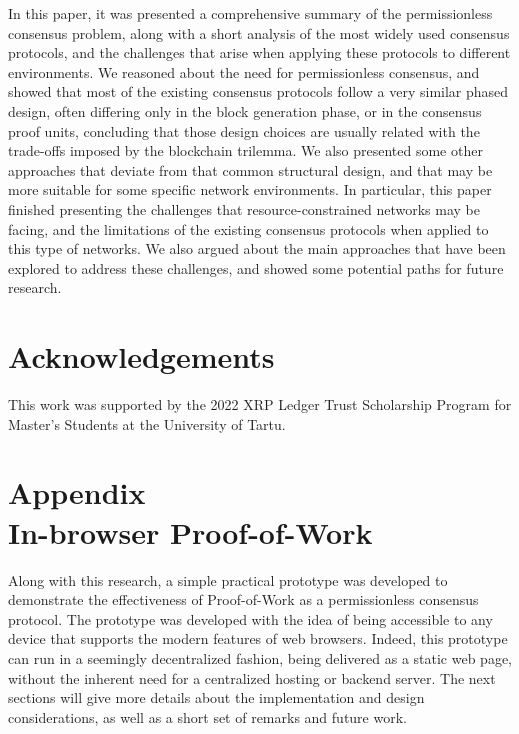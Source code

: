 \documentclass[journal]{IEEEtran}
\begin{document}
In this paper, it was presented a comprehensive summary of the permissionless
consensus problem, along with a short analysis of the most widely used consensus 
protocols, and the challenges that arise when applying these protocols to different environments.
We reasoned about the need for permissionless consensus, and showed that most of the existing
consensus protocols follow a very similar phased design, often differing only in the block
generation phase, or in the consensus proof units, concluding that those design choices are usually 
related with the trade-offs imposed by the blockchain trilemma.
We also presented some other approaches that deviate from that common
structural design, and that may be more suitable for some specific network environments.
In particular, this paper finished presenting the challenges that resource-constrained networks may be facing, 
and the limitations of the existing consensus protocols when applied to this type of networks.
We also argued about the main approaches that have been explored to address these challenges,
and showed some potential paths for future research.

\section{Acknowledgements}

This work was supported by the 2022 XRP Ledger Trust Scholarship Program for Master's Students
at the University of Tartu.

\ifCLASSOPTIONcaptionsoff
  \newpage
\fi

{}


\newpage 

\section[Appendix. In-browser Proof-of-Work]{Appendix\\ {In-browser Proof-of-Work}}

\bigbreak

Along with this research, a simple practical prototype was developed
to demonstrate the effectiveness of Proof-of-Work as a permissionless consensus protocol.
The prototype was developed with the idea of being accessible to any device that supports
the modern features of web browsers. Indeed, this prototype can run in a seemingly decentralized fashion,
being delivered as a static web page, without the inherent need for a centralized hosting or backend server.
The next sections will give more details about the implementation and design considerations, 
as well as a short set of remarks and future work.
\end{document}
